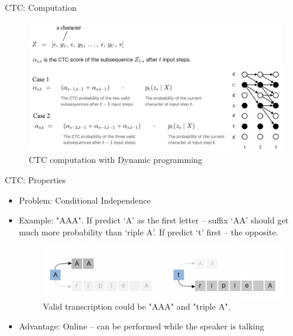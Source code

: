 \begin{frame}{CTC: Computation}
    \begin{figure}
    	\centering
    	\includegraphics[width=0.99\linewidth]{figs/ctc_computation.png}
    	\caption{CTC computation with Dynamic programming}

    \end{figure}
    
\end{frame}
\begin{frame}{CTC: Properties}
\begin{itemize}
    \item Problem: Conditional Independence
    \item Example: "AAA". If predict ‘A’ as the first letter -- suffix ‘AA’ should get much more probability than ‘riple A’. If predict ‘t’ first -- the opposite.
    \begin{figure}
    	\centering
    	\includegraphics[width=0.9\linewidth]{figs/ctc_problem.png}
    	\caption{Valid transcription could be "AAA" and "triple A".}

    \end{figure}
    
    \item Advantage: Online -- can be performed while the speaker is talking
\end{itemize}

\end{frame}
